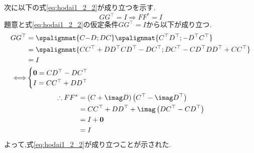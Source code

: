 \begin{enumerate}[(1)]
    次に以下の式\eqref{eq:hodai1_2_2}が成り立つを示す.
    \begin{equation}
        GG^{\top} = I \Rightarrow FF^{\ast} = I \label{eq:hodai1_2_2}
    \end{equation}
    題意と式\eqref{eq:hodai1_2_2}の仮定条件$GG^{\top} = I$から以下が成り立つ.
    \begin{align*}
        GG^{\top} & = 
        \spalignmat{
            C {-D};
            D {C}
        }
        \spalignmat{
            {C^{\top}} {D^{\top}};
            {-D^{\top}} {C^{\top}}
        }\\
        & = 
        \spalignmat{
            {CC^{\top} + DD^{\top}} {CD^{\top} - DC^{\top}};
            {DC^{\top} - CD^{\top}} {DD^{\top} + CC^{\top}}
        }\\
        & = I\\
        \Longleftrightarrow &
        \begin{cases}
            \mbox{\boldmath $0$} = CD^{\top} - DC^{\top}\\
            I = CC^{\top} + DD^{\top}
        \end{cases}
    \end{align*}
    \begin{align*}
        \therefore FF^{\ast} & = \left(C + \imag D\right)\left(C^{\top} - \imag D^{\top}\right)\\
            & = CC^{\top} + DD^{\top} + \imag \left(DC^{\top} - CD^{\top}\right)\\
            & = I + \mbox{\boldmath $0$}\\
            & = I
    \end{align*}
    よって,式\eqref{eq:hodai1_2_2}が成り立つことが示された.


\end{enumerate}
